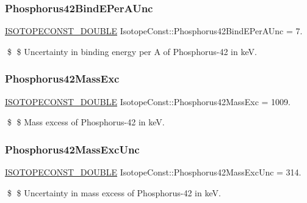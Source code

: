 \subsubsection{\texorpdfstring{Phosphorus42\+Bind\+E\+Per\+A\+Unc}{Phosphorus42BindEPerAUnc}}
{\footnotesize\ttfamily \mbox{\hyperlink{group___isotope_const-_macros_ga8f45a7272ce02c0b4c65c44636ed719a}{I\+S\+O\+T\+O\+P\+E\+C\+O\+N\+S\+T\+\_\+\+D\+O\+U\+B\+LE}} Isotope\+Const\+::\+Phosphorus42\+Bind\+E\+Per\+A\+Unc = 7.}

\$ \$ Uncertainty in binding energy per A of Phosphorus-\/42 in keV. \mbox{\label{group___isotope_const-_phosphorus-_p42_gafc65f2bd37a92d65332dfd1e1129fb16}} 
\subsubsection{\texorpdfstring{Phosphorus42\+Mass\+Exc}{Phosphorus42MassExc}}
{\footnotesize\ttfamily \mbox{\hyperlink{group___isotope_const-_macros_ga8f45a7272ce02c0b4c65c44636ed719a}{I\+S\+O\+T\+O\+P\+E\+C\+O\+N\+S\+T\+\_\+\+D\+O\+U\+B\+LE}} Isotope\+Const\+::\+Phosphorus42\+Mass\+Exc = 1009.}

\$ \$ Mass excess of Phosphorus-\/42 in keV. \mbox{\label{group___isotope_const-_phosphorus-_p42_ga0fa20e1bc7e7ca711077193c913cf75c}} 
\subsubsection{\texorpdfstring{Phosphorus42\+Mass\+Exc\+Unc}{Phosphorus42MassExcUnc}}
{\footnotesize\ttfamily \mbox{\hyperlink{group___isotope_const-_macros_ga8f45a7272ce02c0b4c65c44636ed719a}{I\+S\+O\+T\+O\+P\+E\+C\+O\+N\+S\+T\+\_\+\+D\+O\+U\+B\+LE}} Isotope\+Const\+::\+Phosphorus42\+Mass\+Exc\+Unc = 314.}

\$ \$ Uncertainty in mass excess of Phosphorus-\/42 in keV. \mbox{\label{group___isotope_const-_phosphorus-_p42_ga00f0d03722f3f3bfbd480e516a804ac8}} 
